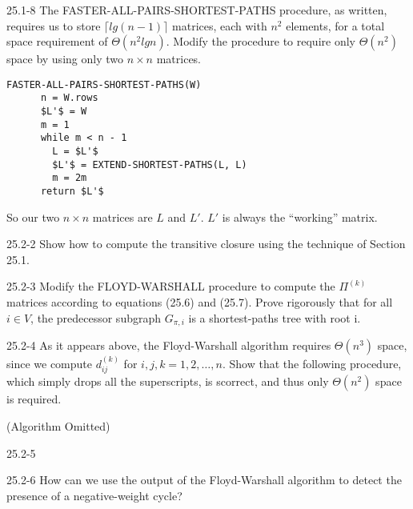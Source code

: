 




\homeworkheader{\classnameandsection}

\begin{problem}{25.1-8}
  The FASTER-ALL-PAIRS-SHORTEST-PATHS procedure, as written, requires us to store $\lceil lg(n-1) \rceil$ matrices,
  each with $n^2$ elements, for a total space requirement of $\Theta(n^2 lg n)$. Modify the procedure to require only
  $\Theta(n^2)$ space by using only two $n \times n$ matrices.
  \begin{solution}
    \begin{lstlisting}[mathescape]
    FASTER-ALL-PAIRS-SHORTEST-PATHS(W)
      n = W.rows
      $L'$ = W
      m = 1
      while m < n - 1
        L = $L'$
        $L'$ = EXTEND-SHORTEST-PATHS(L, L)
        m = 2m
      return $L'$
    \end{lstlisting}
    
    \noindent So our two $n \times n$ matrices are $L$ and $L'$.  $L'$ is always the ``working'' matrix.
  \end{solution}
\end{problem}

\begin{problem}{25.2-2}
  Show how to compute the transitive closure using the technique of Section 25.1.
\end{problem}

\begin{problem}{25.2-3}
  Modify the FLOYD-WARSHALL procedure to compute the $\Pi^{(k)}$ matrices according to equations (25.6) and (25.7).
  Prove rigorously that for all $i \in V$, the predecessor subgraph $G_{\pi,i}$ is a shortest-paths tree with root i.
\end{problem}

\begin{problem}{25.2-4}
  As it appears above, the Floyd-Warshall algorithm requires $\Theta(n^3)$ space, since we compute $d_{ij}^{(k)}$ for
  $i, j, k = 1, 2, \ldots, n$. Show that the following procedure, which simply drops all the superscripts, is scorrect,
  and thus only $\Theta(n^2)$ space is required.

  (Algorithm Omitted)
\end{problem}

\begin{problem}{25.2-5}

\end{problem}

\begin{problem}{25.2-6}
  How can we use the output of the Floyd-Warshall algorithm to detect the presence of a negative-weight cycle?
\end{problem}


